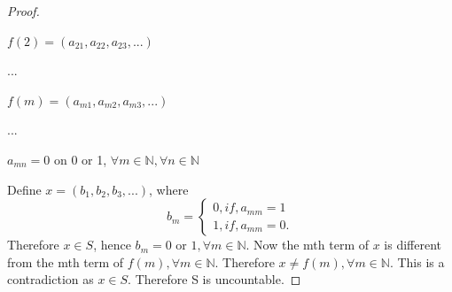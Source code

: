 \documentclass[10pt]{article}
\begin{document}
\begin{enumerate}
\begin{proof}
\begin{center}
        $f(2) = (a_{21}, a_{22}, a_{23},...)$
        
        $...$
        
        $f(m) = (a_{m1}, a_{m2}, a_{m3},...)$
        
        $...$
        
        $a_{mn} = 0$ on 0 or 1, $\forall m \in \mathbb{N}, \forall n \in \mathbb{N}$
    \end{center}
    Define $x = (b_1, b_2, b_3,...)$, where 
\begin{equation}
  b_m=%
  \begin{cases}
    0, if,  a_{mm} = 1 \\
    1, if,  a_{mm}=0.
  \end{cases}
\end{equation}
Therefore $x \in S$, hence $b_m = 0$ or $1, \forall m \in \mathbb{N}$.  Now the mth term of $x$ is different from the mth term of $f(m), \forall m \in \mathbb{N}$.  Therefore $x \neq f(m), \forall m \in \mathbb{N}$.  This is a contradiction as $x \in S$.  Therefore S is uncountable.
\end{proof}
\end{enumerate}
\end{document}
